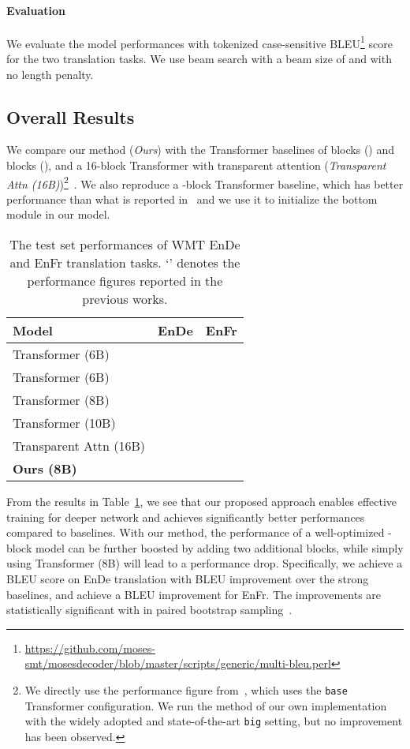 \documentclass[11pt,a4paper]{article}
\begin{document}
\paragraph{Evaluation}
We evaluate the model performances with tokenized case-sensitive BLEU\footnote{\url{https://github.com/moses-smt/mosesdecoder/blob/master/scripts/generic/multi-bleu.perl}} score~\citep{papineni2002bleu} 
for the two translation tasks. We use beam search with a beam size of  and with no length penalty. 

\subsection{Overall Results}
We compare our method ({\em Ours}) with the Transformer baselines of  blocks () and  blocks (), and a 16-block Transformer with transparent attention ({\em Transparent Attn (16B)})\footnote{We directly use the performance figure from~\citep{bapna2018training}, which uses the \texttt{base} Transformer configuration. We run the method of our own implementation with the widely adopted and state-of-the-art \texttt{big} setting, but no improvement has been observed.}~\citep{bapna2018training}. We also reproduce a -block Transformer baseline, which has better performance than what is reported in~\cite{vaswani2017attention} and we use it to initialize the bottom module in our model.

\begin{table}[!tb]
\centering
\caption{The test set performances of WMT EnDe and EnFr translation tasks. `' denotes the performance figures reported in the previous works.}
\begin{tabular}{lll}
\toprule
Model                               & EnDe    & EnFr    \\ \midrule
Transformer (6B)          &       &       \\
Transformer (6B)                    &       &       \\
Transformer (8B)                    &       &       \\
Transformer (10B)                   &       &       \\
Transparent Attn (16B)    &       &           \\
\bf{Ours (8B)}                      &  &  \\
\bottomrule
\end{tabular}
\label{tab:results-wmt}
\end{table}

From the results in Table~\ref{tab:results-wmt}, we see that our proposed approach enables effective training for deeper network and achieves  significantly better performances compared to baselines. With our method, the performance of a well-optimized -block model can be further boosted by adding two additional blocks, while simply using Transformer (8B) will lead to a performance drop. Specifically, we achieve a  BLEU score on EnDe translation with  BLEU improvement over the strong baselines, and achieve a  BLEU improvement for EnFr. The improvements are statistically significant with  in paired bootstrap sampling~\citep{koehn2004statistical}. 
\end{document}
